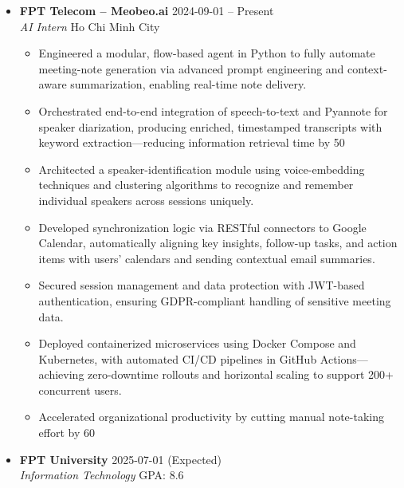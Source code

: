 \documentclass[a4paper,11pt]{article}
\newcommand{\sectiontitle}[1]{\vspace{0.5em}\noindent{\Large\color{primary}\textbf{#1}}\vspace{0.2em}}
\newcommand{\entry}[4]{
    \vspace{0.1em}
    \noindent\textbf{#1} \hfill #2\\
    \textit{#3} \hfill #4
    \vspace{0.1em}
}
\begin{document}
\sectiontitle{Experience}
\begin{itemize}[leftmargin=*, itemsep=0.2em]
    \item \entry{FPT Telecom -- Meobeo.ai}{2024-09-01 -- Present}{AI Intern}{Ho Chi Minh City}
        \begin{itemize}[leftmargin=1.5em, itemsep=0.1em]
            \item Engineered a modular, flow-based agent in Python to fully automate meeting-note generation via advanced prompt engineering and context-aware summarization, enabling real-time note delivery.
            \item Orchestrated end-to-end integration of speech-to-text and Pyannote for speaker diarization, producing enriched, timestamped transcripts with keyword extraction---reducing information retrieval time by 50%
            \item Architected a speaker-identification module using voice-embedding techniques and clustering algorithms to recognize and remember individual speakers across sessions uniquely.
            \item Developed synchronization logic via RESTful connectors to Google Calendar, automatically aligning key insights, follow-up tasks, and action items with users’ calendars and sending contextual email summaries.
            \item Secured session management and data protection with JWT-based authentication, ensuring GDPR-compliant handling of sensitive meeting data.
            \item Deployed containerized microservices using Docker Compose and Kubernetes, with automated CI/CD pipelines in GitHub Actions---achieving zero-downtime rollouts and horizontal scaling to support 200+ concurrent users.
            \item Accelerated organizational productivity by cutting manual note-taking effort by 60%
        \end{itemize}
\end{itemize}

\vspace{0.5em}

\sectiontitle{Education}
\begin{itemize}[leftmargin=*, itemsep=0.2em]
    \item \entry{FPT University}{2025-07-01 (Expected)}{Information Technology}{GPA: 8.6}
\end{itemize}
\end{document}
